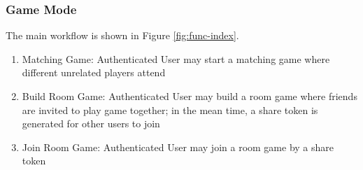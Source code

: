 \documentclass[11pt]{article}
\begin{document}
\subsubsection{Game Mode}
The main workflow is shown in Figure \ref{fig:func-index}.

\begin{enumerate}
\item
Matching Game: Authenticated User may start a matching game where different unrelated players attend
\item
Build Room Game: Authenticated User may build a room game where friends are invited to play game together; in the mean time, a share token is generated for other users to join
\item
Join Room Game: Authenticated User may join a room game by a share token
\end{enumerate}
\end{document}
